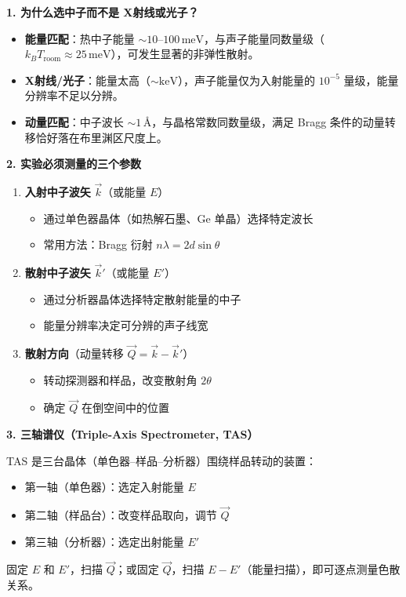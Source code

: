 \begin{insightbox}[实验方法与深层理解]
\textbf{1. 为什么选中子而不是 X射线或光子？}

\begin{itemize}
    \item \textbf{能量匹配}：热中子能量 $\sim10\text{--}100\,\mathrm{meV}$，与声子能量同数量级（$k_BT_{\text{room}}\approx25\,\mathrm{meV}$），可发生显著的非弹性散射。
    \item \textbf{X射线/光子}：能量太高（$\sim\mathrm{keV}$），声子能量仅为入射能量的 $10^{-5}$ 量级，能量分辨率不足以分辨。
    \item \textbf{动量匹配}：中子波长 $\sim1\,\text{\AA}$，与晶格常数同数量级，满足 Bragg 条件的动量转移恰好落在布里渊区尺度上。
\end{itemize}

\textbf{2. 实验必须测量的三个参数}

\begin{enumerate}
    \item \textbf{入射中子波矢} $\vec k$（或能量 $E$）
    \begin{itemize}
        \item 通过单色器晶体（如热解石墨、Ge 单晶）选择特定波长
        \item 常用方法：Bragg 衍射 $n\lambda=2d\sin\theta$
    \end{itemize}
    \item \textbf{散射中子波矢} $\vec k'$（或能量 $E'$）
    \begin{itemize}
        \item 通过分析器晶体选择特定散射能量的中子
        \item 能量分辨率决定可分辨的声子线宽
    \end{itemize}
    \item \textbf{散射方向}（动量转移 $\vec Q=\vec k-\vec k'$）
    \begin{itemize}
        \item 转动探测器和样品，改变散射角 $2\theta$
        \item 确定 $\vec Q$ 在倒空间中的位置
    \end{itemize}
\end{enumerate}

\textbf{3. 三轴谱仪（Triple-Axis Spectrometer, TAS）}

TAS 是三台晶体（单色器--样品--分析器）围绕样品转动的装置：
\begin{itemize}
    \item 第一轴（单色器）：选定入射能量 $E$
    \item 第二轴（样品台）：改变样品取向，调节 $\vec Q$
    \item 第三轴（分析器）：选定出射能量 $E'$
\end{itemize}
固定 $E$ 和 $E'$，扫描 $\vec Q$；或固定 $\vec Q$，扫描 $E-E'$（能量扫描），即可逐点测量色散关系。


\end{insightbox}
